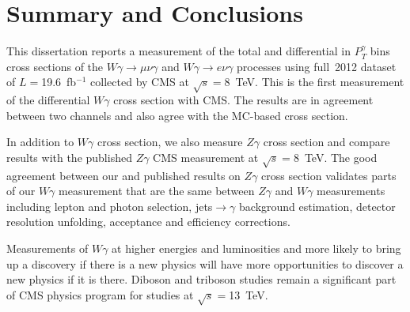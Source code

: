 \chapter{Summary and Conclusions}
\label{sec:Conclusions}

This dissertation reports a measurement of the total and differential in $P_T^{\gamma}$ bins cross sections of the $W\gamma\rightarrow\mu\nu\gamma$ and $W\gamma\rightarrow e\nu\gamma$ processes using full~2012 dataset of $L=$19.6~fb$^{-1}$ collected by CMS at $\sqrt{s}=$8~TeV. This is the first measurement of the differential $W\gamma$ cross section with CMS. The results are in agreement between two channels and also agree with the MC-based cross section.

In addition to $W\gamma$ cross section, we also measure $Z\gamma$ cross section and compare results with the published $Z\gamma$ CMS measurement at $\sqrt{s}=$8~TeV. The good agreement between our and published results on $Z\gamma$ cross section validates parts of our $W\gamma$ measurement that are the same between $Z\gamma$ and $W\gamma$ measurements including lepton and photon selection, jets$\rightarrow\gamma$ background estimation, detector resolution unfolding, acceptance and efficiency corrections.

Measurements of $W\gamma$ at higher energies and luminosities and more likely to bring up a discovery if there is a new physics will have more opportunities to discover a new physics if it is there. Diboson and triboson studies remain a significant part of CMS physics program for studies at $\sqrt{s}=$13~TeV.

